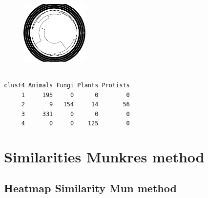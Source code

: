 \documentclass[
  letterpaper,
  DIV=11,
  numbers=noendperiod]{scrreprt}
\newenvironment{Shaded}{\begin{snugshade}}{\end{snugshade}}
\newcommand{\DecValTok}[1]{\textcolor[rgb]{0.68,0.00,0.00}{#1}}
\newcommand{\FunctionTok}[1]{\textcolor[rgb]{0.28,0.35,0.67}{#1}}
\newcommand{\NormalTok}[1]{\textcolor[rgb]{0.00,0.23,0.31}{#1}}
\newcommand{\OtherTok}[1]{\textcolor[rgb]{0.00,0.23,0.31}{#1}}
\newcommand{\SpecialCharTok}[1]{\textcolor[rgb]{0.37,0.37,0.37}{#1}}
\begin{document}
\begin{figure}[H]

{\centering \includegraphics[width=0.3\textwidth,height=\textheight]{index_files/figure-pdf/unnamed-chunk-35-1.pdf}

}

\end{figure}

\begin{Shaded}
\end{Shaded}

\begin{verbatim}
      
clust4 Animals Fungi Plants Protists
     1     195     0      0        0
     2       9   154     14       56
     3     331     0      0        0
     4       0     0    125        0
\end{verbatim}


\hypertarget{similarities-munkres-method}{%
\chapter*{Similarities Munkres
method}\label{similarities-munkres-method}}


\hypertarget{heatmap-similarity-mun-method}{%
\section*{Heatmap Similarity Mun
method}\label{heatmap-similarity-mun-method}}

\end{document}
